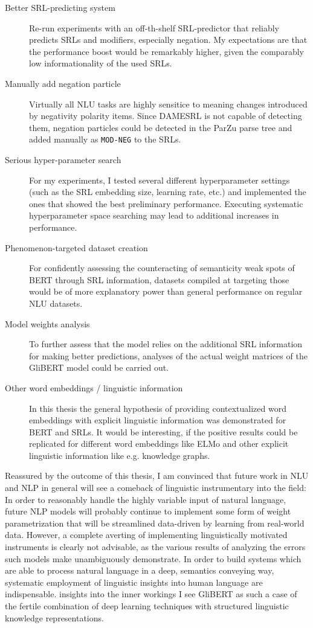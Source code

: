 \begin{description}
  \item[Better SRL-predicting system] Re-run experiments with an off-th-shelf SRL-predictor that reliably
    predicts SRLs and modifiers, especially negation. My expectations are that the performance boost would
    be remarkably higher, given the comparably low informationality of the used SRLs.
  \item[Manually add negation particle] Virtually all NLU tasks are highly sensitice to
    meaning changes introduced by negativity polarity items. Since DAMESRL is not capable
    of detecting them, negation particles could be detected in the ParZu parse tree and
    added manually as \texttt{MOD-NEG} to the SRLs.
  \item[Serious hyper-parameter search] For my experiments, I tested several different hyperparameter
    settings (such as the SRL embedding size, learning rate, etc.) and implemented the ones that
    showed the best preliminary performance. Executing systematic hyperparameter space searching may
    lead to additional increases in performance.
  \item[Phenomenon-targeted dataset creation] For confidently assessing the counteracting of semanticity
    weak spots of BERT through SRL information, datasets compiled at targeting those would be of more
    explanatory power than general performance on regular NLU datasets.
  \item[Model weights analysis] To further assess that the model relies on the additional SRL information for
    making better predictions, analyses of the actual weight matrices of the GliBERT model could be carried out.
  \item[Other word embeddings / linguistic information] In this thesis the general hypothesis of providing
    contextualized word embeddings with explicit linguistic information was demonstrated for BERT and SRLs.
    It would be interesting, if the positive results could be replicated for different word embeddings like
    ELMo and other explicit linguistic information like e.g. knowledge graphs.
\end{description}

Reassured by the outcome of this thesis, I am convinced that future work in NLU and NLP
in general will see a comeback of linguistic instrumentary into the field: In order
to reasonably handle the highly variable input of natural language, future NLP models
will probably continue to implement some form of weight parametrization that will be
streamlined data-driven by learning from real-world data. However, a complete averting
of implementing linguistically motivated instruments is clearly not advisable, as the
various results of analyzing the errors such models make unambiguously demonstrate. In
order to build systems which are able to process natural language in a deep, semantics
conveying way, systematic employment of linguistic insights into human language are
indispensable. insights into the inner workings I see GliBERT as such a case of the
fertile combination of deep learning techniques with structured linguistic knowledge
representations.

